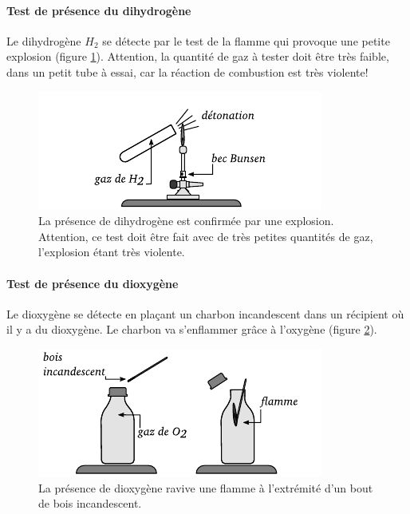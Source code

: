 \paragraph{Test de présence du dihydrogène}
Le dihydrogène $H_2$ se détecte par le test de la flamme qui provoque une petite explosion (figure 
\ref{fig:test_presence_H2}).
Attention, la quantité de gaz à tester doit être très faible, dans un petit tube à essai, 
car la réaction de combustion est très violente!
\begin{figure}[h]
  \begin{center}
      \includegraphics[width=\columnwidth]{1.1.-melanges/test_presence_H2.pdf}
  \end{center}
  \caption{La présence de dihydrogène est confirmée par une explosion. Attention, ce test doit être
  fait avec de très petites quantités de gaz, l'explosion étant très violente.}
  \label{fig:test_presence_H2}
\end{figure}

\paragraph{Test de présence du dioxygène}
Le dioxygène se détecte en plaçant un charbon incandescent dans un récipient où il y a du dioxygène.
Le charbon va s'enflammer grâce à l'oxygène (figure \ref{fig:test_presence_O2}).
\begin{figure}[h]
  \begin{center}
      \includegraphics[width=\columnwidth]{1.1.-melanges/test_presence_O2.pdf}
  \end{center}
  \caption{La présence de dioxygène ravive une flamme à l'extrémité d'un bout de bois incandescent.}
  \label{fig:test_presence_O2}
\end{figure}

